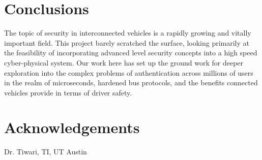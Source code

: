 \documentclass[a0,landscape]{a0poster}
\begin{document}
\begin{multicols}{3}

\color{SaddleBrown} %

\section*{Conclusions}
The topic of security in interconnected vehicles is a rapidly growing and vitally important field. This project barely scratched the surface, looking primarily at the feasibility of incorporating advanced level security concepts into a high speed cyber-physical system. Our work here has set up the ground work for deeper exploration into the complex problems of authentication across millions of users in the realm of microseconds, hardened bus protocols, and the benefits connected vehicles provide in terms of driver safety.



\section*{Acknowledgements}
Dr. Tiwari, TI, UT Austin


\end{multicols}
\end{document}
